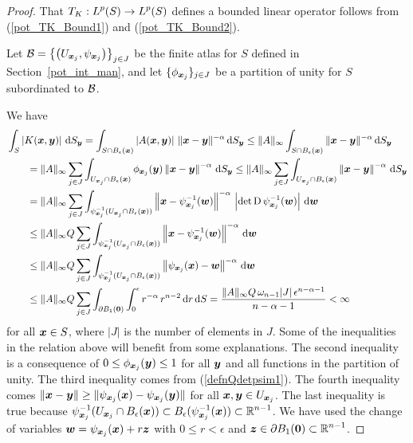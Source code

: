 \begin{proof}
That $\displaystyle T_K : L^p(S) \rightarrow L^p(S)$ defines a bounded linear
operator follows from (\ref{pot_TK_Bound1}) and (\ref{pot_TK_Bound2}).

Let $\displaystyle \mathcal{B}
= \left\{ \left(U_{{\bm{x}}_j}, \psi_{{\bm{x}}_j}\right) \right\}_{j\in J}$
be the finite atlas for $S$ defined in Section~\ref{pot_int_man}, and
let $\displaystyle \{ \phi_{{\bm{x}}_j} \}_{j\in J}$ be a partition of unity
for $S$ subordinated to $\mathcal{B}$.

We have
\begin{align*}
&\int_S \left| K({\bm{x}},{\bm{y}}) \right| \,\mathrm{d}{S}_{{\bm{y}}}
= \int_{S\cap B_\epsilon({\bm{x}})} \left| A({\bm{x}},{\bm{y}}) \right| \,
\|{\bm{x}}-{\bm{y}}\|^{-\alpha} \,\mathrm{d}{S}_{{\bm{y}}}
\leq \|A\|_\infty
\int_{S\cap B_\epsilon({\bm{x}})} \|{\bm{x}}-{\bm{y}}\|^{-\alpha} \,\mathrm{d}{S}_{{\bm{y}}} \\ 
&\qquad = \|A\|_\infty \sum_{j\in J}
\int_{U_{{\bm{x}}_j}\cap B_\epsilon({\bm{x}})} \phi_{{\bm{x}}_j}({\bm{y}})
\left\|{\bm{x}} - {\bm{y}} \right\|^{-\alpha} \,\mathrm{d}{S}_{{\bm{y}}}
\leq \|A\|_\infty \sum_{j\in J} \int_{U_{{\bm{x}}_j}\cap B_\epsilon({\bm{x}})}
\left\|{\bm{x}} - {\bm{y}} \right\|^{-\alpha} \,\mathrm{d}{S}_{{\bm{y}}} \\
&\qquad = \|A\|_\infty \sum_{j\in J}
\int_{\psi_{{\bm{x}}_j}^{-1}(U_{{\bm{x}}_j}\cap B_\epsilon({\bm{x}}))}
\left\| {\bm{x}} - \psi_{{\bm{x}}_j}^{-1}({\bm{w}}) \right\|^{-\alpha}
\, \left|\det \operatorname{D} \psi_{{\bm{x}}_j}^{-1} ({\bm{w}}) \right| \,\mathrm{d}{{\bm{w}}} \\
&\qquad \leq \|A\|_\infty Q \sum_{j\in J}
\int_{\psi_{{\bm{x}}_j}^{-1}(U_{{\bm{x}}_j}\cap B_\epsilon({\bm{x}}))}
\left\| {\bm{x}} - \psi_{{\bm{x}}_j}^{-1}({\bm{w}}) \right\|^{-\alpha} \,\mathrm{d}{{\bm{w}}}
\\
&\qquad \leq \|A\|_\infty Q \sum_{j\in J}
\int_{\psi_{{\bm{x}}_j}^{-1}(U_{{\bm{x}}_j}\cap B_\epsilon({\bm{x}}))}
\left\| \psi_{{\bm{x}}_j}({\bm{x}}) - {\bm{w}} \right\|^{-\alpha} \,\mathrm{d}{{\bm{w}}} \\
&\qquad \leq \|A\|_\infty Q \sum_{j\in J} \int_{\partial B_1({\bm{0}})}
\int_0^{\epsilon} r^{-\alpha}\,r^{n-2} \,\mathrm{d}{r} \,\mathrm{d}{S}
= \frac{\|A\|_\infty Q\, \omega_{n-1} |J|\, \epsilon^{n-\alpha-1}}{n-\alpha-1}
< \infty
\end{align*}
for all ${\bm{x}} \in S$, where $|J|$ is the number of elements in $J$.
Some of the inequalities in the relation above will benefit from
some explanations.  The second inequality is a consequence of
$0 \leq \phi_{{\bm{x}}_j}({\bm{y}}) \leq 1$ for all
${\bm{y}}$ and all functions in the partition of unity.
The third inequality comes from (\ref{defnQdetpsim1}).  The fourth
inequality comes
$\displaystyle \|{\bm{x}}-{\bm{y}}\|
\geq \|\psi_{{\bm{x}}_j}({\bm{x}}) - \psi_{{\bm{x}}_j}({\bm{y}})\|$ for all
$\displaystyle {\bm{x}},{\bm{y}} \in U_{{\bm{x}}_j}$.
The last inequality is true because
$\displaystyle \psi_{{\bm{x}}_j}^{-1}(U_{{\bm{x}}_j}\cap B_\epsilon({\bm{x}}))
\subset B_\epsilon(\psi_{{\bm{x}}_j}^{-1}({\bm{x}})) \subset \mathbb{R}^{n-1}$.
We have used the change of
variables ${\bm{w}} = \psi_{{\bm{x}}_j}({\bm{x}}) + r {\bm{z}}$ with
$0 \leq r < \epsilon$ and
$\displaystyle {\bm{z}} \in \partial B_1({\bm{0}}) \subset \mathbb{R}^{n-1}$.


\end{proof}
